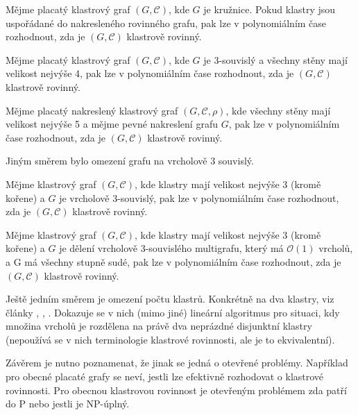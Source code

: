 \begin{theorem}
Mějme placatý klastrový graf  $(G, \mathcal C)$, kde $G$ je kružnice. Pokud klastry jsou uspořádané do nakresleného rovinného grafu, pak lze v polynomiálním čase rozhodnout, zda je  $(G, \mathcal C)$ klastrově rovinný.
\end{theorem}

\begin{theorem}
Mějme placatý klastrový graf  $(G, \mathcal C)$, kde $G$ je 3-souvislý a všechny stěny mají velikost nejvýše 4, pak lze v polynomiálním čase rozhodnout, zda je  $(G, \mathcal C)$ klastrově rovinný.
\end{theorem}

\begin{theorem}
Mějme placatý nakreslený klastrový graf  $(G, \mathcal C, \rho)$, kde všechny stěny mají velikost nejvýše 5 a mějme pevné nakreslení grafu $G$, pak lze v polynomiálním čase rozhodnout, zda je  $(G, \mathcal C)$ klastrově rovinný.
\end{theorem}

Jiným směrem bylo omezení grafu na vrcholově 3 souvislý.

\begin{theorem}
Mějme klastrový graf $(G, \mathcal C)$, kde klastry mají velikost nejvýše 3 (kromě kořene) a $G$ je vrcholově 3-souvislý, pak lze v polynomiálním čase rozhodnout, zda je  $(G, \mathcal C)$ klastrově rovinný. 
\end{theorem}

\begin{theorem}
Mějme klastrový graf $(G, \mathcal C)$, kde klastry mají velikost nejvýše 3 (kromě kořene) a $G$ je dělení vrcholově 3-souvislého multigrafu, který má $\mathcal O(1)$ vrcholů, a G má všechny stupně sudé, pak lze v polynomiálním čase rozhodnout, zda je  $(G, \mathcal C)$ klastrově rovinný. 
\end{theorem}

Ještě jedním směrem je omezení počtu klastrů. Konkrétně na dva klastry, viz články \cite{BiedlI98}, \cite{BiedlII98}, \cite{BiedlIII98}. Dokazuje se v nich (mimo jiné) lineární algoritmus pro situaci, kdy množina vrcholů je rozdělena na právě dva neprázdné disjunktní klastry (nepoužívá se v nich terminologie klastrové rovinnosti, ale je to ekvivalentní). 

Závěrem je nutno poznamenat, že jinak se jedná o otevřené problémy. Například pro obecné placaté grafy se neví, jestli lze efektivně rozhodovat o klastrové rovinnosti. Pro obecnou klastrovou rovinnost je otevřeným problémem zda patří do P nebo jestli je NP-úplný.
